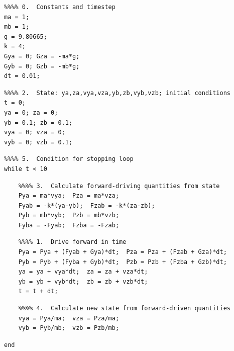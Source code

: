 \documentclass[a4paper,12pt,%
onecolumn,oneside,titlepage,%
british%
]{memoir}
\newcommand*{\amp}{\&}
\renewcommand*{\|}[1][]{\nonscript\:#1\vert\nonscript\:\mathopen{}}
\begin{document}
\begin{table}[p]
  \caption{Example script for numerical time integration of the spring\,\amp\,bodies system. The \textcolor{red}{constants}, \textcolor{yellow}{initial values}, and the \textcolor{midgrey}{stop condition} (stop at \qty{10}{s}) can of course be different. Vector components are declared on one line.}\label{tab:script_strategy}

\small
\begin{framed}
\color{red}\begin{verbatim}
%%%% 0.  Constants and timestep
ma = 1;
mb = 1;
g = 9.80665;
k = 4;
Gya = 0; Gza = -ma*g;
Gyb = 0; Gzb = -mb*g;
dt = 0.01;
\end{verbatim}
\vspace{-1.5\baselineskip}
\color{yellow}\begin{verbatim}
%%%% 2.  State: ya,za,vya,vza,yb,zb,vyb,vzb; initial conditions
t = 0;
ya = 0; za = 0;
yb = 0.1; zb = 0.1;
vya = 0; vza = 0;
vyb = 0; vzb = 0.1;
\end{verbatim}
\vspace{-1.5\baselineskip}
\color{midgrey}\begin{verbatim}
%%%% 5.  Condition for stopping loop
while t < 10
\end{verbatim}
\vspace{-1.5\baselineskip}
\color{blue}\begin{verbatim}
    %%%% 3.  Calculate forward-driving quantities from state
    Pya = ma*vya;  Pza = ma*vza;
    Fyab = -k*(ya-yb);  Fzab = -k*(za-zb);
    Pyb = mb*vyb;  Pzb = mb*vzb;
    Fyba = -Fyab;  Fzba = -Fzab;
\end{verbatim}
\vspace{-1.5\baselineskip}
\color{green}\begin{verbatim}
    %%%% 1.  Drive forward in time
    Pya = Pya + (Fyab + Gya)*dt;  Pza = Pza + (Fzab + Gza)*dt;
    Pyb = Pyb + (Fyba + Gyb)*dt;  Pzb = Pzb + (Fzba + Gzb)*dt;
    ya = ya + vya*dt;  za = za + vza*dt;
    yb = yb + vyb*dt;  zb = zb + vzb*dt;
    t = t + dt;
\end{verbatim}
\vspace{-1.5\baselineskip}
\color{cyan}\begin{verbatim}
    %%%% 4.  Calculate new state from forward-driven quantities
    vya = Pya/ma;  vza = Pza/ma;
    vyb = Pyb/mb;  vzb = Pzb/mb;
\end{verbatim}
\vspace{-1.5\baselineskip}
\color{midgrey}\begin{verbatim}
end
\end{verbatim}
\end{framed}
\end{table}
\end{document}
